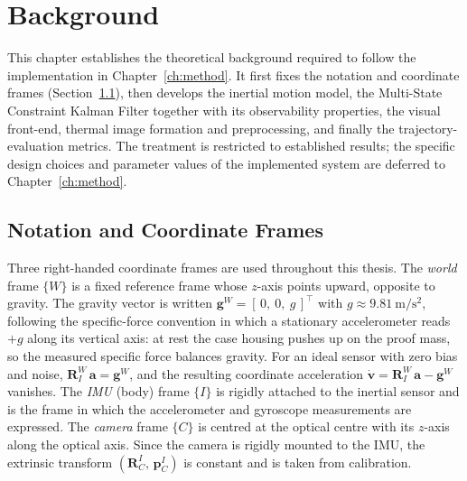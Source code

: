 \chapter{Background}
\label{ch:background}

This chapter establishes the theoretical background required to follow the implementation in Chapter~\ref{ch:method}. It first fixes the notation and coordinate frames (Section~\ref{sec:bg_frames}), then develops the inertial motion model, the Multi-State Constraint Kalman Filter together with its observability properties, the visual front-end, thermal image formation and preprocessing, and finally the trajectory-evaluation metrics. The treatment is restricted to established results; the specific design choices and parameter values of the implemented system are deferred to Chapter~\ref{ch:method}.

\section{Notation and Coordinate Frames}
\label{sec:bg_frames}
Three right-handed coordinate frames are used throughout this thesis. The \emph{world} frame $\{W\}$ is a fixed reference frame whose $z$-axis points upward, opposite to gravity. The gravity vector is written $\mathbf{g}^{W} = [\,0,\ 0,\ g\,]^{\top}$ with $g \approx 9.81~\mathrm{m/s^2}$, following the specific-force convention in which a stationary accelerometer reads $+g$ along its vertical axis: at rest the case housing pushes up on the proof mass, so the measured specific force balances gravity. For an ideal sensor with zero bias and noise, $\mathbf{R}_{I}^{W}\,\mathbf{a} = \mathbf{g}^{W}$, and the resulting coordinate acceleration $\dot{\mathbf{v}} = \mathbf{R}_{I}^{W}\,\mathbf{a} - \mathbf{g}^{W}$ vanishes. The \emph{IMU} (body) frame $\{I\}$ is rigidly attached to the inertial sensor and is the frame in which the accelerometer and gyroscope measurements are expressed. The \emph{camera} frame $\{C\}$ is centred at the optical centre with its $z$-axis along the optical axis. Since the camera is rigidly mounted to the IMU, the extrinsic transform $(\mathbf{R}_{C}^{I},\,\mathbf{p}_{C}^{I})$ is constant and is taken from calibration.

